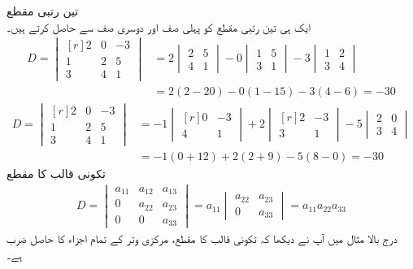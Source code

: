\quad تین رتبی مقطع\\
ایک ہی تین رتبی مقطع کو پہلی صف اور دوسری صف سے حاصل کرتے ہیں۔
\begin{align*}
D=\begin{vmatrix*}[r] 2&0&-3\\1&2&5\\3&4&1 \end{vmatrix*}&=
2\begin{vmatrix} 2&5\\4&1 \end{vmatrix}-0\begin{vmatrix} 1&5\\3&1 \end{vmatrix}-3\begin{vmatrix} 1&2\\3&4 \end{vmatrix}\\
&=2(2-20)-0(1-15)-3(4-6)=-30
\end{align*}
%
\begin{align*}
D=\begin{vmatrix*}[r] 2&0&-3\\1&2&5\\3&4&1 \end{vmatrix*}&=
-1\begin{vmatrix*}[r] 0&-3\\4&1 \end{vmatrix*}+2\begin{vmatrix*}[r] 2&-3\\3&1 \end{vmatrix*}-5\begin{vmatrix} 2&0\\3&4 \end{vmatrix}\\
&=-1(0+12)+2(2+9)-5(8-0)=-30
\end{align*}
\quad تکونی قالب کا مقطع\\
\begin{align}
D=\begin{vmatrix} a_{11}&a_{12}&a_{13}\\0&a_{22}&a_{23}\\0&0&a_{33} \end{vmatrix}=a_{11}\begin{vmatrix} a_{22}&a_{23}\\0&a_{33} \end{vmatrix}=a_{11}a_{22}a_{33}
\end{align}
درج بالا مثال میں آپ نے دیکھا کہ تکونی قالب کا مقطع، مرکزی وتر کے تمام اجزاء کا حاصل ضرب ہے۔

